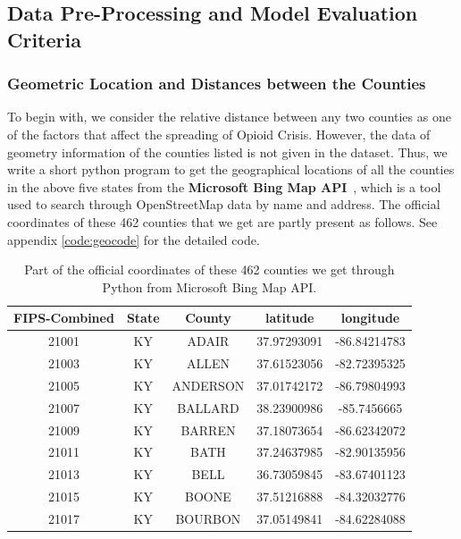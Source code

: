 \documentclass{mcmthesis}
\begin{document}
\subsection{Data Pre-Processing and Model Evaluation Criteria}

\subsubsection{Geometric Location and Distances between the Counties}

To begin with, we consider the relative distance between any two counties as one of the factors that affect the spreading of Opioid Crisis. However, the data of geometry information of the counties listed is not given in the dataset. Thus, we write a short python program to get the geographical locations of all the counties in the above five states from the \textbf{Microsoft Bing Map API}~\cite{bing}, which is a tool used to search through OpenStreetMap data by name and address. The official coordinates of these 462 counties that we get are partly present as follows. See appendix \ref{code:geocode} for the detailed code. 
    
\begin{table}[H]
    \centering
     \caption{Part of the official coordinates of these 462 counties we get through Python from Microsoft Bing Map API.}
    \label{tab:geotable}
    \begin{tabular}{|c|c|c|c|c|}
        \hline
FIPS-Combined &	State &	County &	latitude &	longitude \\ \hline
21001 &	KY &	ADAIR&	37.97293091	&-86.84214783\\
21003&	KY&	ALLEN&	37.61523056&	-82.72395325\\
21005&	KY&	ANDERSON&	37.01742172	&-86.79804993\\
21007&	KY&	BALLARD&	38.23900986	&-85.7456665\\
21009&	KY&	BARREN&	37.18073654&	-86.62342072\\
21011&	KY&	BATH&	37.24637985&	-82.90135956\\
21013&	KY& BELL&	36.73059845&   -83.67401123\\
21015&	KY&	BOONE&	37.51216888&	-84.32032776\\
21017&	KY&	BOURBON	&37.05149841&	-84.62284088\\
\hline
    \end{tabular}
\end{table}    
    
\end{document}
